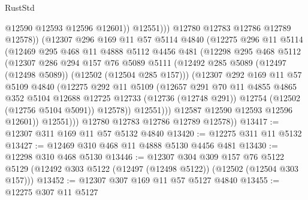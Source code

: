 \begin{lexlean}{RustStd}
\begin{coremodule}
                          @12590
                          @12593
                          @12596
                          @12601))
                      @12551)))
                @12780
                @12783
                @12786
                @12789
                @12578))
            (@12307
              @296
              @169
              @11
              @57
              @5114
              @4840
              (@12275
                @296
                @11
                @5114
                (@12469
                  @295
                  @468
                  @11
                  @4888
                  @5112
                  @4456
                  @481
                  (@12298
                    @295
                    @468
                    @5112
                    (@12307
                      @286
                      @294
                      @157
                      @76
                      @5089
                      @5111
                      (@12492 @285 @5089 (@12497 (@12498 @5089)) (@12502 (@12504 @285 @157)))
                      (@12307
                        @292
                        @169
                        @11
                        @57
                        @5109
                        @4840
                        (@12275
                          @292
                          @11
                          @5109
                          (@12657
                            @291
                            @70
                            @11
                            @4855
                            @4865
                            @352
                            @5104
                            @12688
                            @12725
                            @12733
                            (@12736 (@12748 @291))
                            @12754
                            (@12502 (@12756 @5104 @5091))
                            @12578))
                        @12551)))
                  @12587
                  @12590
                  @12593
                  @12596
                  @12601))
              @12551)))
        @12780
        @12783
        @12786
        @12789
        @12578))
@13417 := @12307 @311 @169 @11 @57 @5132 @4840
@13420 := @12275 @311 @11 @5132
@13427 := @12469 @310 @468 @11 @4888 @5130 @4456 @481
@13430 := @12298 @310 @468 @5130
@13446 := @12307
    @304
    @309
    @157
    @76
    @5122
    @5129
    (@12492 @303 @5122 (@12497 (@12498 @5122)) (@12502 (@12504 @303 @157)))
@13452 := @12307 @307 @169 @11 @57 @5127 @4840
@13455 := @12275 @307 @11 @5127

\end{coremodule}
\end{lexlean}
